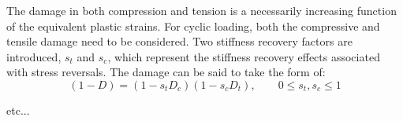 
The damage in both compression and tension is a necessarily increasing
function of the equivalent plastic strains. For cyclic loading, both the compressive and tensile damage need to
be considered. Two stiffness recovery factors are introduced, $s_{t}$
and $s_{c}$, which represent the stiffness recovery effects associated
with stress reversals. The damage can be said to take the form of:
\begin{equation}
(1-D)=(1-s_{t}D_{c})(1-s_{c}D_{t}),\qquad0\leq s_{t},s_{c}\leq1\label{eqn:dam4}
\end{equation}

etc...
